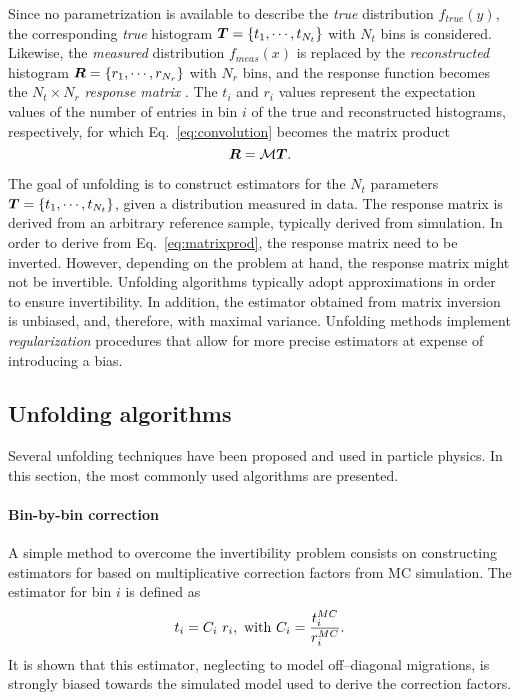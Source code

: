 Since no parametrization is available to describe the {\it true}
distribution $f_{true}(y)$, the corresponding {\it true} histogram
$\boldsymbol{T}{}=\{t_1,\cdots{},t_{N_t}\}$ with $N_t$ bins is
considered. Likewise, the {\it measured} distribution $f_{meas}(x)$ is
replaced by the {\it reconstructed} histogram $\boldsymbol{R}{}=\{r_1,\cdots{},r_{N_r}\}$ with
$N_r$ bins, and the response function becomes the $N_t\times N_r$ {\it
  response matrix} \TrasfMatrix{}.
The $t_i$ and $r_i$ values represent the expectation values of the number of
entries in bin $i$ of the true and reconstructed histograms,
respectively, for which Eq.~\ref{eq:convolution} becomes the matrix product
\begin{equation}
\label{eq:matrixprod}
\boldsymbol{R}{} = \mathcal{M}{}\boldsymbol{T}{}.
\end{equation}

The goal of unfolding is to construct estimators for the $N_t$
parameters $\boldsymbol{T}{}=\{t_1,\cdots{},t_{N_t}\}$, given a distribution
measured in data. The response matrix \TrasfMatrix{} is derived from
an arbitrary reference sample, typically derived from simulation.
In order to derive \Truth{} from Eq.~\ref{eq:matrixprod}, the response
matrix \TrasfMatrix{} need to be inverted. However, depending on the
problem at hand, the response matrix might not be
invertible. Unfolding algorithms typically adopt approximations in
order to ensure invertibility. In addition, the estimator obtained from
matrix inversion is unbiased, and, therefore, with maximal
variance. Unfolding methods implement {\it regularization} procedures
that allow for more precise estimators at expense of introducing a bias.

\subsection{Unfolding algorithms}

Several unfolding techniques have been proposed and used in particle
physics. In this section, the most commonly used algorithms are
presented.

\paragraph{Bin-by-bin correction}
A simple method to overcome the invertibility problem consists on
constructing estimators for \Truth{} based on multiplicative
correction factors from MC simulation. The estimator for bin $i$ is
defined as
\begin{equation}
t_i = C_i~r_i,~{\rm with}~C_i=\frac{t_i^{MC}}{r_i^{MC}}.
\end{equation}
It is shown that this estimator, neglecting to model off--diagonal
migrations, is strongly biased towards the simulated model used to
derive the correction factors. 
